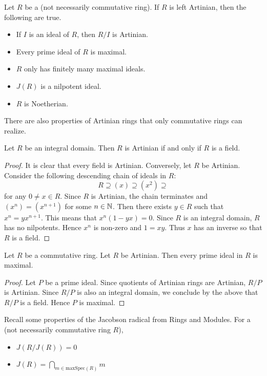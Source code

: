 \documentclass[a4paper]{article}
\begin{document}
Let $R$ be a (not necessarily commutative ring). If $R$ is left Artinian, then the following are true. 

\begin{itemize}
\item If $I$ is an ideal of $R$, then $R/I$ is Artinian. 
\item Every prime ideal of $R$ is maximal. 
\item $R$ only has finitely many maximal ideals. 
\item $J(R)$ is a nilpotent ideal. 
\item $R$ is Noetherian. 
\end{itemize}

There are also properties of Artinian rings that only commutative rings can realize. 

\begin{prp}{}{} Let $R$ be an integral domain. Then $R$ is Artinian if and only if $R$ is a field. \tcbline
\begin{proof}
It is clear that every field is Artinian. Conversely, let $R$ be Artinian. Consider the following descending chain of ideals in $R$: $$R\supseteq(x)\supseteq(x^2)\supseteq$$ for any $0\neq x\in R$. Since $R$ is Artinian, the chain terminates and $(x^n)=(x^{n+1})$ for some $n\in\mathbb{N}$. Then there exists $y\in R$ such that $x^n=yx^{n+1}$. This means that $x^n(1-yx)=0$. Since $R$ is an integral domain, $R$ has no nilpotents. Hence $x^n$ is non-zero and $1=xy$. Thus $x$ has an inverse so that $R$ is a field. 
\end{proof}
\end{prp}

\begin{prp}{}{} Let $R$ be a commutative ring. Let $R$ be Artinian. Then every prime ideal in $R$ is maximal. \tcbline
\begin{proof}
Let $P$ be a prime ideal. Since quotients of Artinian rings are Artinian, $R/P$ is Artinian. Since $R/P$ is also an integral domain, we conclude by the above that $R/P$ is a field. Hence $P$ is maximal. 
\end{proof}
\end{prp}

Recall some properties of the Jacobson radical from Rings and Modules. For a (not necessarily commutative ring $R$), 
\begin{itemize}
\item $J(R/J(R))=0$
\item $J(R)=\bigcap_{m\in\text{maxSpec}(R)}m$
\end{itemize}
\end{document}
